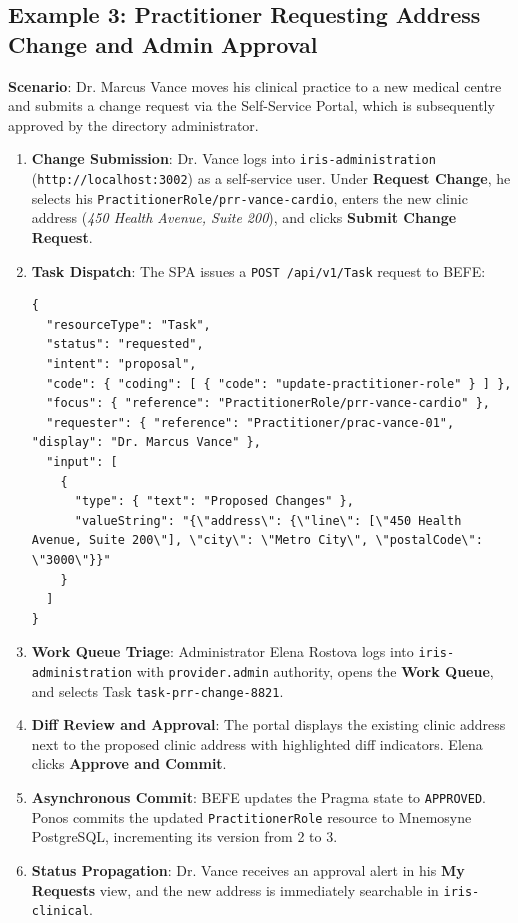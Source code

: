 \subsection{Example 3: Practitioner Requesting Address Change and Admin Approval}

\textbf{Scenario}: Dr. Marcus Vance moves his clinical practice to a new medical centre and submits a change request via the Self-Service Portal, which is subsequently approved by the directory administrator.

\begin{enumerate}
    \item \textbf{Change Submission}: Dr. Vance logs into \texttt{iris-administration} (\texttt{http://localhost:3002}) as a self-service user. Under \textbf{Request Change}, he selects his \texttt{PractitionerRole/prr-vance-cardio}, enters the new clinic address (\textit{450 Health Avenue, Suite 200}), and clicks \textbf{Submit Change Request}.
    \item \textbf{Task Dispatch}: The SPA issues a \texttt{POST /api/v1/Task} request to BEFE:
\begin{lstlisting}[caption={Governed Change Request Submission Payload}]
{
  "resourceType": "Task",
  "status": "requested",
  "intent": "proposal",
  "code": { "coding": [ { "code": "update-practitioner-role" } ] },
  "focus": { "reference": "PractitionerRole/prr-vance-cardio" },
  "requester": { "reference": "Practitioner/prac-vance-01", "display": "Dr. Marcus Vance" },
  "input": [
    {
      "type": { "text": "Proposed Changes" },
      "valueString": "{\"address\": {\"line\": [\"450 Health Avenue, Suite 200\"], \"city\": \"Metro City\", \"postalCode\": \"3000\"}}"
    }
  ]
}
\end{lstlisting}
    \item \textbf{Work Queue Triage}: Administrator Elena Rostova logs into \texttt{iris-administration} with \texttt{provider.admin} authority, opens the \textbf{Work Queue}, and selects Task \texttt{task-prr-change-8821}.
    \item \textbf{Diff Review and Approval}: The portal displays the existing clinic address next to the proposed clinic address with highlighted diff indicators. Elena clicks \textbf{Approve and Commit}.
    \item \textbf{Asynchronous Commit}: BEFE updates the Pragma state to \texttt{APPROVED}. Ponos commits the updated \texttt{PractitionerRole} resource to Mnemosyne PostgreSQL, incrementing its version from 2 to 3.
    \item \textbf{Status Propagation}: Dr. Vance receives an approval alert in his \textbf{My Requests} view, and the new address is immediately searchable in \texttt{iris-clinical}.
\end{enumerate}
